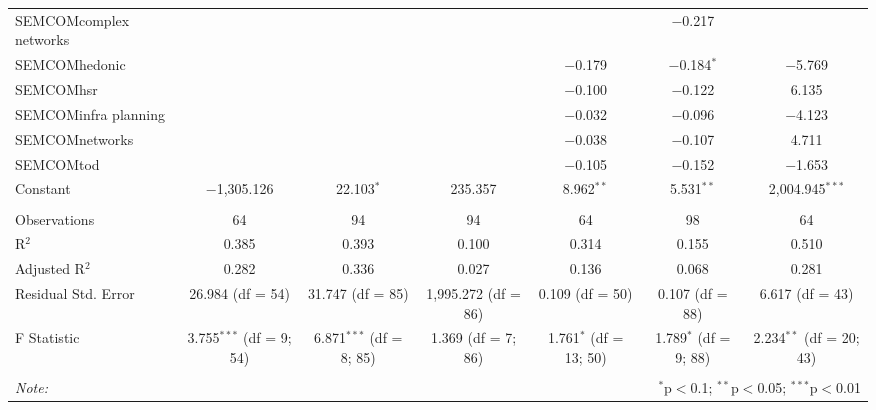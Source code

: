 \begin{table}[!htbp]
\begin{tabular}{@{\extracolsep{5pt}}lcccccc}
  SEMCOMcomplex networks &  &  &  &  & $-$0.217 &  \\ 
  SEMCOMhedonic &  &  &  & $-$0.179 & $-$0.184$^{*}$ & $-$5.769 \\ 
  SEMCOMhsr &  &  &  & $-$0.100 & $-$0.122 & 6.135 \\ 
  SEMCOMinfra planning &  &  &  & $-$0.032 & $-$0.096 & $-$4.123 \\ 
  SEMCOMnetworks &  &  &  & $-$0.038 & $-$0.107 & 4.711 \\ 
  SEMCOMtod &  &  &  & $-$0.105 & $-$0.152 & $-$1.653 \\ 
  Constant & $-$1,305.126 & 22.103$^{*}$ & 235.357 & 8.962$^{**}$ & 5.531$^{**}$ & 2,004.945$^{***}$ \\ 
 \hline \\[-1.8ex] 
Observations & 64 & 94 & 94 & 64 & 98 & 64 \\ 
R$^{2}$ & 0.385 & 0.393 & 0.100 & 0.314 & 0.155 & 0.510 \\ 
Adjusted R$^{2}$ & 0.282 & 0.336 & 0.027 & 0.136 & 0.068 & 0.281 \\ 
Residual Std. Error & 26.984 (df = 54) & 31.747 (df = 85) & 1,995.272 (df = 86) & 0.109 (df = 50) & 0.107 (df = 88) & 6.617 (df = 43) \\ 
F Statistic & 3.755$^{***}$ (df = 9; 54) & 6.871$^{***}$ (df = 8; 85) & 1.369 (df = 7; 86) & 1.761$^{*}$ (df = 13; 50) & 1.789$^{*}$ (df = 9; 88) & 2.234$^{**}$ (df = 20; 43) \\ 
\hline 
\hline \\[-1.8ex] 
\textit{Note:}  & \multicolumn{6}{r}{$^{*}$p$<$0.1; $^{**}$p$<$0.05; $^{***}$p$<$0.01} \\ 
\end{tabular} 
\end{table} 
